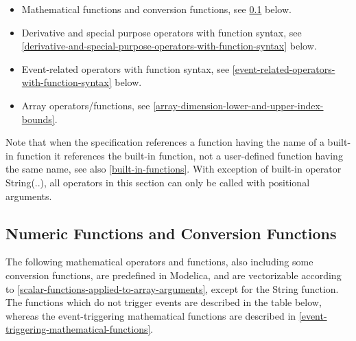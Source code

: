\documentclass[10pt,a4paper]{report}
\def\doublelabel#1{\label{#1}\hypertarget{#1}{}}
\begin{document}
\begin{itemize}
\item
  Mathematical functions and conversion functions, see \ref{numeric-functions-and-conversion-functions}
  below.
\item
  Derivative and special purpose operators with function syntax, see
  \ref{derivative-and-special-purpose-operators-with-function-syntax} below.
\item
  Event-related operators with function syntax, see \ref{event-related-operators-with-function-syntax} below.
\item
  Array operators/functions, see \ref{array-dimension-lower-and-upper-index-bounds}.
\end{itemize}

Note that when the specification references a function having the name
of a built-in function it references the built-in function, not a
user-defined function having the same name, see also \ref{built-in-functions}. With
exception of built-in operator String(..), all operators in this section
can only be called with positional arguments.

\subsection{Numeric Functions and Conversion Functions}\doublelabel{numeric-functions-and-conversion-functions}

The following mathematical operators and functions, also including some
conversion functions, are predefined in Modelica, and are vectorizable
according to \ref{scalar-functions-applied-to-array-arguments}, except for the String function. The
functions which do not trigger events are described in the table below,
whereas the event-triggering mathematical functions are described in
\ref{event-triggering-mathematical-functions}.
\end{document}
